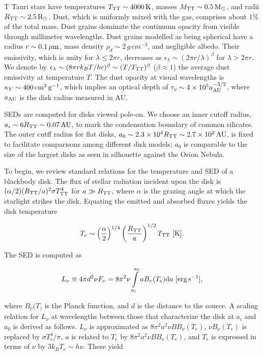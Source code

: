 \documentclass[a4paper,10pt]{article}
\begin{document}
{\noindent}T Tauri stars have temperatures $T_{\rm TT}\sim4000\,{\rm K}$, masses $M_{\rm TT}\sim0.5\,{\rm M_\odot}$, and radii $R_{\rm TT}\sim2.5\,{\rm R_\odot}$. Dust, which is uniformly mixed with the gas, comprises about $1\%$ of the total mass. Dust grains dominate the continuum opacity from visible through millimeter wavelengths. Dust grains modelled as being spherical have a radius $r\sim0.1\,\mu{\rm m}$, mass density $\rho_d\sim2\,{g\,cm^{-3}}$, and negligible albedo. Their emissivity, which is unity for $\lambda\leq2\pi r$, decreases as $\epsilon_\lambda\sim(2\pi r/\lambda)^\beta$ for $\lambda>2\pi r$. We denote by $\epsilon_\lambda\sim(8\pi rk_BT/hc)^\beta\sim(T/T_{\rm TT})^\beta$ ($\beta\approx1$) the average dust emissivity at temperature $T$. The dust opacity at visual wavelengths is $\kappa_V\sim400\,{\rm cm^2\,g^{-1}}$, which implies an optical depth of $\tau_v\sim4\times10^5a_{\rm AU}^{-3/2}$, where $a_{\rm AU}$ is the disk radius measured in AU.

{\noindent}SEDs are computed for disks viewed pole-on. We choose
an inner cutoff radius, $a_i\sim6R_{\rm TT}\sim0.07\,{\rm AU}$, to mark the condensation boundary of common silicates. The outer cutff radius for flat disks, $a_0\sim2.3\times10^4R_{\rm TT}\sim2.7\times10^2\,{\rm AU}$, is fixed to facilitate comparisons among different disk models; $a_0$ is comparable to the size of the largest disks as seen in silhouette against the Orion Nebula.

{\noindent}To begin, we review standard relations for the temperature and SED of a blackbody disk. The flux of stellar radiation incident upon the disk is $(\alpha/2)(R_{\rm TT}/a)^2\sigma T_{\rm TT}^4$ for $a\gg R_{\rm TT}$, where $\alpha$ is the grazing angle at which the starlight strikes the disk. Equating the emitted and absorbed fluxes yields the disk temperature 

\begin{align*}
    T_e \sim \left(\frac{\alpha}{2}\right)^{1/4} \left(\frac{R_{\rm TT}}{a}\right)^{1/2} T_{\rm TT} ~ [{\rm K}].
\end{align*}

{\noindent}The SED is computed as

\begin{align*}
    L_\nu \equiv 4\pi d^2\nu F_\nu = 8\pi^2\nu \int\limits_{a_i}^{a_0} aB_\nu(T_e){\rm d}a ~ [{\rm erg\,s^{-1}}],
\end{align*}

{\noindent}where $B_\nu(T_)$ is the Planck function, and $d$ is the distance to the source. A scaling relation for $L_\nu$ at wavelengths between those that characterize the disk at $a_i$ and $a_0$ is derived as follows. $L_\nu$ is approximated as $8\pi^2a^2\nu BB_\nu(T_e)$, $\nu B_\nu(T_e)$ is replaced by $\sigma T_e^4/\pi$, $a$ is related to $T_e$ by $8\pi^2a^2\nu BB_\nu(T_e)$, and $T_e$ is expressed in terms of $\nu$ by $3k_BT_e\sim h\nu$. These yield
\end{document}
